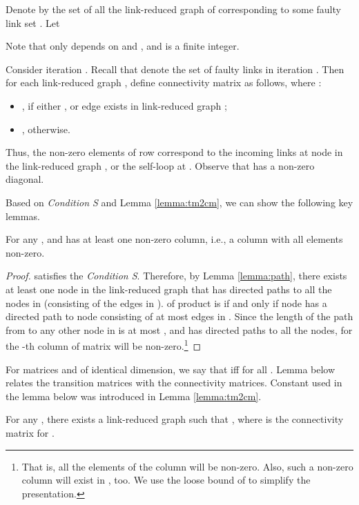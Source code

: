 \documentclass{llncs}
\newcommand{\fillbox}{\hspace*{\fill}}
\begin{document}
Denote by  the set of all the link-reduced graph of  corresponding to some faulty link set . Let



Note that  only depends on  and , and is a finite integer.

Consider iteration . Recall that  denote the set of faulty links in iteration . Then for each link-reduced graph , define connectivity matrix  as follows, where :

\begin{itemize}
\item , if either , or edge  exists in link-reduced graph ;
\item , otherwise.
\end{itemize}

Thus, the non-zero elements of row  correspond to the incoming links at node  in the link-reduced graph , or the self-loop at . Observe that  has a non-zero diagonal.


Based on {\em Condition S} and Lemma \ref{lemma:tm2cm}, we can show the following key lemmas. 


\begin{lemma}
\label{lemma:non-zero}
For any , and  has at least one non-zero column, i.e., a column with all elements non-zero.
\end{lemma}



\begin{proof}
 satisfies the {\em Condition S}. Therefore, by Lemma \ref{lemma:path},
there exists at least one node  in the link-reduced graph  that has directed paths to all the nodes in  (consisting of the edges in ).  of product  is  if and only if node  has a directed path to node  consisting of at most  edges in . Since the length of the path from  to any other node in  is at most , and  has directed paths to all the nodes, for  the -th column of matrix  will be non-zero.\footnote{That is, all the elements of the column will be non-zero. Also, such a non-zero column will exist in , too. We use the loose bound of  to simplify the presentation.} 
\fillbox
\end{proof}



For matrices  and  of identical dimension, we say that  iff  for all . Lemma below relates the transition matrices with the connectivity matrices. Constant  used in the lemma below was introduced in
Lemma \ref{lemma:tm2cm}.


\begin{lemma}
\label{lemma:cm}
For any , there exists a link-reduced graph  such  that , where  is the connectivity matrix for .
\end{lemma}
\end{document}
